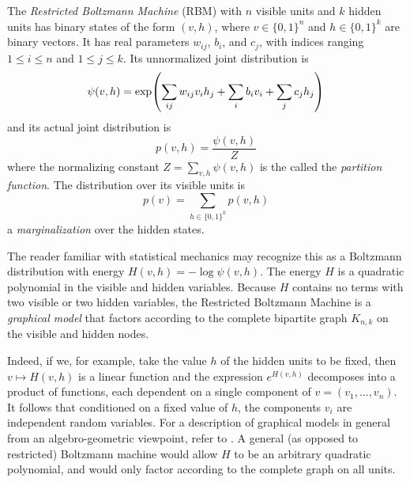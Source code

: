 \documentclass[11pt,titlepage]{article}
\numberwithin{equation}{section}
\begin{document}
    \begin{definition}
    The \emph{Restricted Boltzmann Machine} (RBM) with $n$ visible units and $k$
    hidden units has binary states of the form $(v, h)$, where $v \in \{0,1\}^n$
    and $h \in \{0,1\}^k$ are binary vectors.  It has real parameters $w_{ij}$,
    $b_i$, and $c_j$, with indices ranging $1 \le i \le n$ and $1 \le j \le k$.
    Its unnormalized joint distribution is
    \begin{equation}\label{eq:rbm-unnorm}
        \psi(v, h) = \exp\pdil*{
            \sum_{ij} w_{ij} v_i h_j + \sum_i b_i v_i + \sum_j c_j h_j
        }
    \end{equation}
    and its actual joint distribution is 
    \[
        p(v, h) = \frac{\psi(v,h)}{Z}
    \] 
    where the normalizing constant $Z = \sum_{v,h} \psi(v, h)$ is the called the
    \emph{partition function}.  The distribution over its visible units is
    \[
        p(v) = \sum_{h \in \{0,1\}^k} p(v,h)
    \]
    a \emph{marginalization} over the hidden states.
    \end{definition}
    The reader familiar with statistical mechanics may recognize this as a
    Boltzmann distribution with energy $H(v,h) = - \log \psi(v, h)$.  The energy
    $H$ is a quadratic polynomial in the visible and hidden variables.  Because
    $H$ contains no terms with two visible or two hidden variables, the
    Restricted Boltzmann Machine is a \emph{graphical model} that factors
    according to the complete bipartite graph $K_{n,k}$ on the visible and
    hidden nodes.
    \begin{center}
    \end{center}
    Indeed, if we, for example, take the value $h$ of the hidden units to be
    fixed, then $v \mapsto H(v, h)$ is a linear function and the expression
    $e^{H(v,h)}$ decomposes into a product of functions, each dependent on a
    single component of $v = (v_1, \ldots, v_n)$.  It follows that conditioned
    on a fixed value of $h$, the components $v_i$ are independent random
    variables.  For a description of graphical models in general from an
    algebro-geometric viewpoint, refer to \cite{DSS08}.  A general (as opposed
    to restricted) Boltzmann machine would allow $H$ to be an arbitrary
    quadratic polynomial, and would only factor according to the complete graph
    on all units.
    
\end{document}
